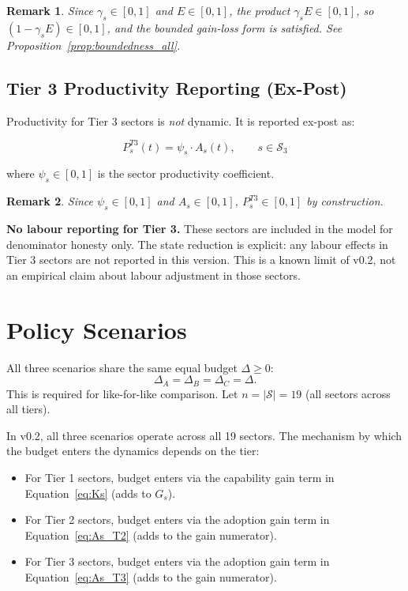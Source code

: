 \documentclass[11pt,a4paper]{article}
\newtheorem{remark}{Remark}
\begin{document}
\begin{remark}
Since $\gamma_s \in [0,1]$ and $E \in [0,1]$, the product $\gamma_s E \in [0,1]$, so $(1 - \gamma_s E) \in [0,1]$, and the bounded gain-loss form is satisfied. See Proposition~\ref{prop:boundedness_all}.
\end{remark}

\subsection{Tier 3 Productivity Reporting (Ex-Post)}

Productivity for Tier 3 sectors is \emph{not} dynamic. It is reported ex-post as:

\begin{equation}
P_s^{T3}(t) = \psi_s\cdot A_s(t), \qquad s \in \mathcal{S}_3
\label{eq:Ps_T3}
\end{equation}

where $\psi_s \in [0,1]$ is the sector productivity coefficient.

\begin{remark}
Since $\psi_s \in [0,1]$ and $A_s \in [0,1]$, $P_s^{T3} \in [0,1]$ by construction.
\end{remark}

\textbf{No labour reporting for Tier 3.} These sectors are included in the model for denominator honesty only. The state reduction is explicit: any labour effects in Tier 3 sectors are not reported in this version. This is a known limit of v0.2, not an empirical claim about labour adjustment in those sectors.

\section{Policy Scenarios}
\label{sec:scenarios}

All three scenarios share the same equal budget $\Delta \geq 0$:
\[
\Delta_A = \Delta_B = \Delta_C = \Delta.
\]
This is required for like-for-like comparison. Let $n = |\mathcal{S}| = 19$ (all sectors across all tiers).

In v0.2, all three scenarios operate across all 19 sectors. The mechanism by which the budget enters the dynamics depends on the tier:
\begin{itemize}
  \item For Tier 1 sectors, budget enters via the capability gain term in Equation~\eqref{eq:Ks} (adds to $G_s$).
  \item For Tier 2 sectors, budget enters via the adoption gain term in Equation~\eqref{eq:As_T2} (adds to the gain numerator).
  \item For Tier 3 sectors, budget enters via the adoption gain term in Equation~\eqref{eq:As_T3} (adds to the gain numerator).
\end{itemize}
\end{document}
